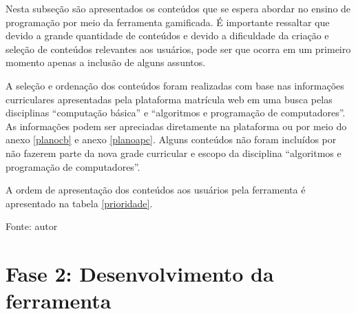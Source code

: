 Nesta subseção são apresentados os conteúdos que se espera abordar no ensino de programação por meio da ferramenta gamificada. É importante  
ressaltar que devido a grande quantidade de conteúdos e devido a dificuldade da criação e seleção de conteúdos relevantes aos usuários, pode 
ser que ocorra em um primeiro momento apenas a inclusão de alguns assuntos. 

A seleção e ordenação dos conteúdos foram realizadas com base nas informações curriculares apresentadas pela plataforma matrícula web em uma 
busca pelas disciplinas “computação básica” e “algoritmos e programação de computadores”. As informações podem ser apreciadas diretamente na 
plataforma ou por meio do anexo \ref{planocb} e anexo \ref{planoapc}. Alguns conteúdos não foram incluídos por não fazerem parte da nova grade curricular e escopo da 
disciplina “algoritmos e programação de computadores”.

A ordem de apresentação dos conteúdos aos usuários pela ferramenta é apresentado na tabela \ref{prioridade}.

\begin{table}[h]
	\centering
	\caption{Prioridade de conteúdos.}
	\label{prioridade}
	Fonte: autor
\end{table}


\section{Fase 2: Desenvolvimento da ferramenta}

